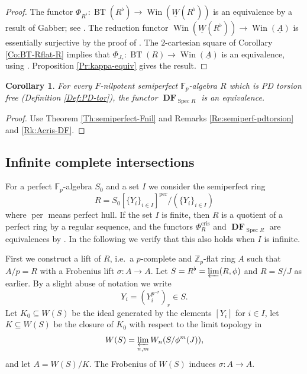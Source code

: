 \documentclass[a4paper,11pt]{article}
\theoremstyle{plain}
\newtheorem{Cor}[Lemma]{Corollary}
\theoremstyle{definition}
\theoremstyle{remark}
\theoremstyle{definition}
\numberwithin{Lemma}{section}
\numberwithin{Subpoint}{Lemma}
\numberwithin{equation}{section}
\newcommand{\DD}{{\mathbb{D}}}
\newcommand{\FF}{{\mathbb{F}}}
\newcommand{\ZZ}{{\mathbb{Z}}}
\DeclareMathOperator{\BT}{BT}
\DeclareMathOperator{\DFfun}{\mathbf{DF}} %
\DeclareMathOperator{\Spec}{Spec}
\DeclareMathOperator{\Win}{Win}
\DeclareMathOperator{\cris}{cris}
\DeclareMathOperator{\per}{per}
\renewcommand{\u}{\underline}
\newcommand{\chang}[1]{{#1}}
\begin{document}
\begin{proof}
The functor $\Phi_{R^\flat}:\BT(R^\flat)\to\Win(\u W(R^\flat))$
is an equivalence by a result of Gabber; 
see \cite[Thm.\ 6.4]{Lau:Smoothness}.
The reduction functor $\Win(\u W(R^\flat))\to\Win(\u A)$
is essentially surjective
by the proof of \cite[Thm.~5.7]{Lau:Semiperfect}. 
The $2$-cartesian square of Corollary \ref{Co:BT-Rflat-R} 
implies that $\Phi_{J_*}:\BT(R)\to\Win(\u A)$ is an equivalence,
using \cite[Lemma 5.9]{Lau:Semiperfect}. 
Proposition \ref{Pr:kappa-equiv} gives the result.
\end{proof}

\begin{Cor}
\label{Co:semiperfect-Fnil}
\chang{For every $F$-nilpotent semiperfect $\FF_p$-algebra $R$ which is PD torsion free (Definition \ref{Def:PD-tor}), the functor $\DFfun_{\Spec R}$ is an equivalence.}
\end{Cor}

\begin{proof}
Use Theorem \ref{Th:semiperfect-Fnil} and Remarks \ref{Re:semiperf-pdtorsion} and \ref{Rk:Acris-DF}.
\end{proof}

\subsection{Infinite complete intersections}

For a perfect $\FF_p$-algebra $S_0$ and a set $I$ we consider the 
semiperfect ring
\begin{equation}
\label{Eq:RI}
R=S_0[\{Y_i\}_{i\in I}]^{\per}/(\{Y_i\}_{i\in I})
\end{equation}
where $\per$ means perfect hull.
If the set $I$ is finite, then $R$ is a quotient of a
perfect ring by a regular sequence, and the functors
$\Phi_R^{\cris}$ and $\DFfun_{\Spec R}$ 
are equivalences by \cite[Cor.~5.11 \& 5.13]{Lau:Semiperfect}.
In the following we verify that this also holds when $I$ is infinite.

First we construct a lift of $R$, i.e.\ a \chang{$p$-complete}
and $\ZZ_p$-flat ring $A$ such that $A/p=R$ with a Frobenius
lift $\sigma:A\to A$.
Let $S=R^{\flat}=\varprojlim(R,\phi)$
and $R=S/J$ as earlier.
By a slight abuse of notation we write
\[
Y_i=(Y_i^{p^{-r}})_r\in S.
\] 
Let $K_0\subseteq W(S)$ be the ideal 
generated by the elements $[Y_i]$ for $i\in I$,
let $K\subseteq W(S)$ be the closure of $K_0$ 
with respect to the limit topology in
\[
W(S)=\varprojlim_{n,m}W_n(S/\phi^m(J)),
\]
and let $A=W(S)/K$. The Frobenius of $W(S)$ induces $\sigma:A\to A$.
\end{document}
